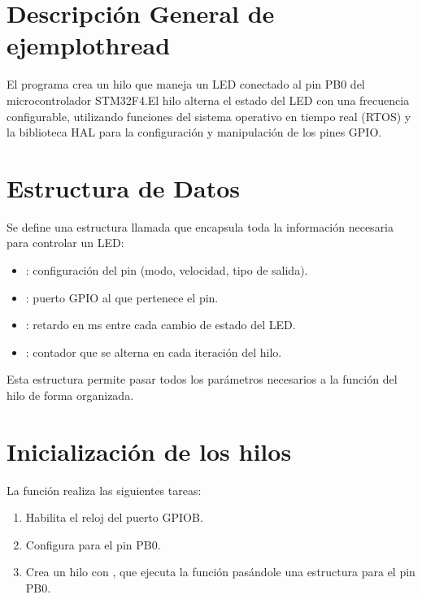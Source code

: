 \documentclass[letterpaper,10pt,english]{sphinxmanual}
\begin{document}
\section{Descripción General de ejemplothread}
\label{\detokenize{ejemplothread:descripcion-general-de-ejemplothread}}
\sphinxAtStartPar
El programa crea un hilo que maneja un LED conectado al pin PB0  del microcontrolador STM32F4.El hilo alterna el estado del LED con una frecuencia configurable, utilizando funciones del sistema operativo en tiempo real (RTOS) y la biblioteca HAL para la configuración y manipulación de los pines GPIO.


\section{Estructura de Datos}
\label{\detokenize{ejemplothread:estructura-de-datos}}
\sphinxAtStartPar
Se define una estructura llamada  que encapsula toda la información necesaria para controlar un LED:
\begin{itemize}
\item {} 
\sphinxAtStartPar
{}: configuración del pin (modo, velocidad, tipo de salida).

\item {} 
\sphinxAtStartPar
{}: puerto GPIO al que pertenece el pin.

\item {} 
\sphinxAtStartPar
{}: retardo en ms entre cada cambio de estado del LED.

\item {} 
\sphinxAtStartPar
{}: contador que se alterna en cada iteración del hilo.

\end{itemize}

\sphinxAtStartPar
Esta estructura permite pasar todos los parámetros necesarios a la función del hilo de forma organizada.


\section{Inicialización de los hilos}
\label{\detokenize{ejemplothread:inicializacion-de-los-hilos}}
\sphinxAtStartPar
La función  realiza las siguientes tareas:
\begin{enumerate}
%
\item {} 
\sphinxAtStartPar
Habilita el reloj del puerto GPIOB.

\item {} 
\sphinxAtStartPar
Configura  para el pin PB0.

\item {} 
\sphinxAtStartPar
Crea un hilo con , que ejecuta la función  pasándole una estructura  para el pin PB0.

\end{enumerate}
\end{document}
